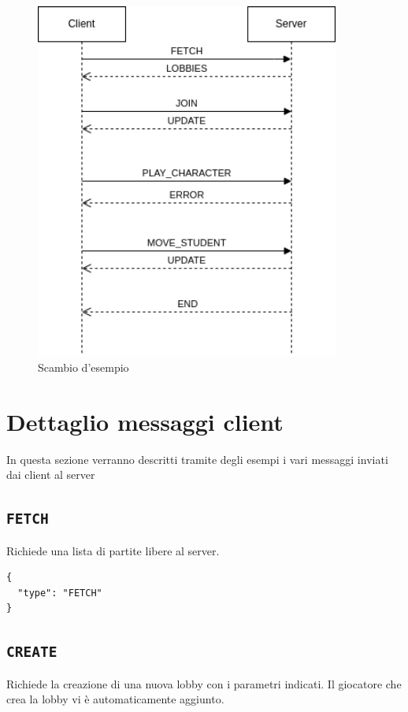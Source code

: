 \documentclass[a4paper,12pt]{article}
\begin{document}
\begin{figure}[htb]
  \centering
  \includegraphics[width=10cm]{example.png}
  \caption{Scambio d'esempio}%
  \label{fig:example}
\end{figure}

\newpage

\section{Dettaglio messaggi client}

In questa sezione verranno descritti tramite degli esempi i vari messaggi
inviati dai client al server

\subsection{\texttt{FETCH}}

Richiede una lista di partite libere al server.

\begin{verbatim}
{
  "type": "FETCH"
}
\end{verbatim}

\subsection{\texttt{CREATE}}

Richiede la creazione di una nuova lobby con i parametri indicati. Il
giocatore che crea la lobby vi è automaticamente aggiunto.
\end{document}
